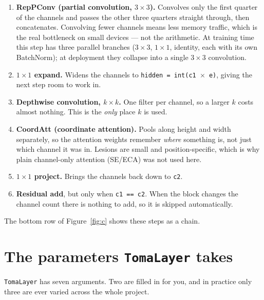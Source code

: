 \documentclass[11pt,a4paper]{article}
\newcommand{\tl}{\texttt{TomaLayer}}
\begin{document}
\begin{enumerate}
  \item \textbf{RepPConv (partial convolution, $3{\times}3$).} Convolves only the first
    quarter of the channels and passes the other three quarters straight through, then
    concatenates. Convolving fewer channels means less memory traffic, which is the real
    bottleneck on small devices --- not the arithmetic. At training time this step has
    three parallel branches ($3{\times}3$, $1{\times}1$, identity, each with its own
    BatchNorm); at deployment they collapse into a single $3{\times}3$ convolution.
  \item \textbf{$1{\times}1$ expand.} Widens the channels to
    \texttt{hidden = int(c1 $\times$ e)}, giving the next step room to work in.
  \item \textbf{Depthwise convolution, $k{\times}k$.} One filter per channel, so a larger
    $k$ costs almost nothing. This is the \emph{only} place $k$ is used.
  \item \textbf{CoordAtt (coordinate attention).} Pools along height and width separately,
    so the attention weights remember \emph{where} something is, not just which channel it
    was in. Lesions are small and position-specific, which is why plain channel-only
    attention (SE/ECA) was not used here.
  \item \textbf{$1{\times}1$ project.} Brings the channels back down to \texttt{c2}.
  \item \textbf{Residual add}, but only when \texttt{c1 == c2}. When the block changes the
    channel count there is nothing to add, so it is skipped automatically.
\end{enumerate}

\noindent The bottom row of Figure~\ref{fig:c} shows these steps as a chain.

\section{The parameters \tl{} takes}
\tl{} has seven arguments. Two are filled in for you, and in practice only three are ever
varied across the whole project.
\end{document}
